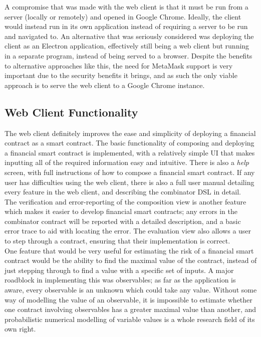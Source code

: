 A compromise that was made with the web client is that it must be run from a server (locally or remotely) and opened in Google Chrome. Ideally, the client would instead run in its own application instead of requiring a server to be run and navigated to. An alternative that was seriously considered was deploying the client as an Electron application, effectively still being a web client but running in a separate program, instead of being served to a browser. Despite the benefits to alternative approaches like this, the need for MetaMask support is very important due to the security benefits it brings, and as such the only viable approach is to serve the web client to a Google Chrome instance.


\subsection{Web Client Functionality}

The web client definitely improves the ease and simplicity of deploying a financial contract as a smart contract. The basic functionality of composing and deploying a financial smart contract is implemented, with a relatively simple UI that makes inputting all of the required information easy and intuitive. There is also a \textit{help} screen, with full instructions of how to compose a financial smart contract. If any user has difficulties using the web client, there is also a full user manual detailing every feature in the web client, and describing the combinator DSL in detail. \\

The verification and error-reporting of the composition view is another feature which makes it easier to develop financial smart contracts; any errors in the combinator contract will be reported with a detailed description, and a basic error trace to aid with locating the error. The evaluation view also allows a user to step through a contract, ensuring that their implementation is correct. \\

One feature that would be very useful for estimating the risk of a financial smart contract would be the ability to find the maximal value of the contract, instead of just stepping through to find a value with a specific set of inputs. A major roadblock in implementing this was observables; as far as the application is aware, every observable is an unknown which could take any value. Without some way of modelling the value of an observable, it is impossible to estimate whether one contract involving observables has a greater maximal value than another, and probabilistic numerical modelling of variable values is a whole research field of its own right. \\


